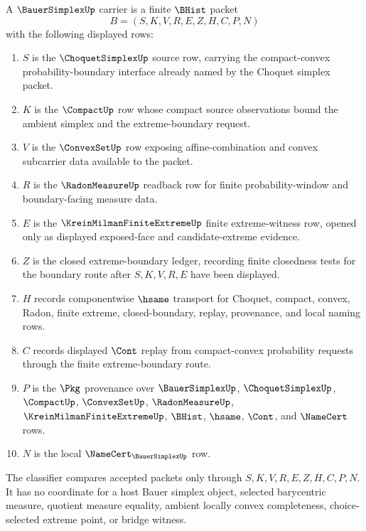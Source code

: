 \begin{definition}
\label{def:bauer-simplex-carrier}
A $\BauerSimplexUp$ carrier is a finite $\BHist$ packet
$$
B=(S,K,V,R,E,Z,H,C,P,N)
$$
with the following displayed rows:
\begin{enumerate}
\item $S$ is the $\ChoquetSimplexUp$ source row, carrying the compact-convex
probability-boundary interface already named by the Choquet simplex packet.
\item $K$ is the $\CompactUp$ row whose compact source observations bound the
ambient simplex and the extreme-boundary request.
\item $V$ is the $\ConvexSetUp$ row exposing affine-combination and convex
subcarrier data available to the packet.
\item $R$ is the $\RadonMeasureUp$ readback row for finite probability-window
and boundary-facing measure data.
\item $E$ is the $\KreinMilmanFiniteExtremeUp$ finite extreme-witness row,
opened only as displayed exposed-face and candidate-extreme evidence.
\item $Z$ is the closed extreme-boundary ledger, recording finite closedness
tests for the boundary route after $S,K,V,R,E$ have been displayed.
\item $H$ records componentwise $\hsame$ transport for Choquet, compact,
convex, Radon, finite extreme, closed-boundary, replay, provenance, and local
naming rows.
\item $C$ records displayed $\Cont$ replay from compact-convex probability
requests through the finite extreme-boundary route.
\item $P$ is the $\Pkg$ provenance over $\BauerSimplexUp$,
$\ChoquetSimplexUp$, $\CompactUp$, $\ConvexSetUp$, $\RadonMeasureUp$,
$\KreinMilmanFiniteExtremeUp$, $\BHist$, $\hsame$, $\Cont$, and $\NameCert$
rows.
\item $N$ is the local $\NameCert_{\BauerSimplexUp}$ row.
\end{enumerate}
The classifier compares accepted packets only through $S,K,V,R,E,Z,H,C,P,N$.
It has no coordinate for a host Bauer simplex object, selected barycentric
measure, quotient measure equality, ambient locally convex completeness,
choice-selected extreme point, or bridge witness.
\end{definition}

